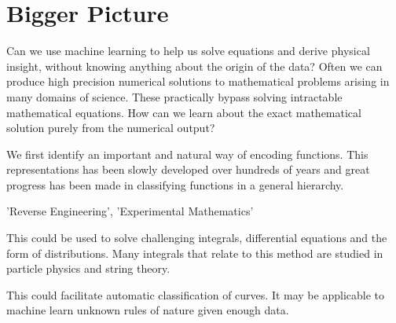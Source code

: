 \documentclass{article}
\begin{document}
\begin{abstract}
\end{abstract}


\section{Bigger Picture}

Can we use machine learning to help us solve equations and derive physical insight, without knowing anything about the origin of the data?
Often we can produce high precision numerical solutions to mathematical problems arising in many domains of science. These practically bypass solving intractable mathematical equations. How can we learn about the exact mathematical solution purely from the numerical output?

We first identify an important and natural way of encoding functions. This representations has been slowly developed over hundreds of years and great progress has been made in classifying functions in a general hierarchy. 

'Reverse Engineering', 'Experimental Mathematics'


This could be used to solve challenging integrals, differential equations and the form of distributions. Many integrals that relate to this method are studied in particle physics and string theory. 

This could facilitate automatic classification of curves. It may be applicable to machine learn unknown rules of nature given enough data.
\end{document}

